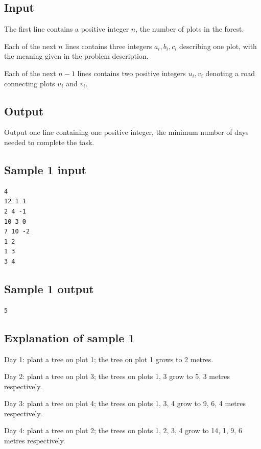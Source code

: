 \documentclass[11pt]{article}
\begin{document}
\subsection*{Input}

The first line contains a positive integer $n$, the number of plots in
the forest.

Each of the next $n$ lines contains three integers $a_i, b_i, c_i$
describing one plot, with the meaning given in the problem description.

Each of the next $n - 1$ lines contains two positive integers $u_i, v_i$
denoting a road connecting plots $u_i$ and $v_i$.

\subsection*{Output}

Output one line containing one positive integer, the minimum number of
days needed to complete the task.

\subsection*{Sample 1 input}

\begin{verbatim}
4
12 1 1
2 4 -1
10 3 0
7 10 -2
1 2
1 3
3 4
\end{verbatim}

\subsection*{Sample 1 output}

\begin{verbatim}
5
\end{verbatim}

\subsection*{Explanation of sample 1}

Day 1: plant a tree on plot 1; the tree on plot 1 grows to 2 metres.

Day 2: plant a tree on plot 3; the trees on plots 1, 3 grow to 5, 3
metres respectively.

Day 3: plant a tree on plot 4; the trees on plots 1, 3, 4 grow to 9, 6, 4
metres respectively.

Day 4: plant a tree on plot 2; the trees on plots 1, 2, 3, 4 grow to
14, 1, 9, 6 metres respectively.
\end{document}
